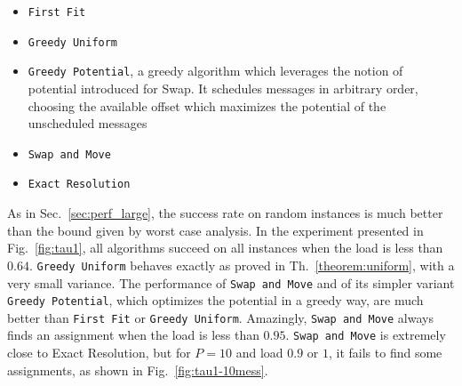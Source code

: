 \documentclass[a4paper,UKenglish,cleveref, autoref, thm-restate]{lipics-v2019}
\newcommand\firstfit{\texttt{First Fit}\xspace}
\newcommand\greedyuniform{\texttt{Greedy Uniform}\xspace}
\newcommand\swapandmove{\texttt{Swap and Move}\xspace}
\newcommand\greedypotential{\texttt{Greedy Potential}\xspace}
\begin{document}
\begin{itemize}
  \item \firstfit
  \item \greedyuniform 
  \item \greedypotential, a greedy algorithm which leverages the notion of potential introduced for Swap. 
  It schedules messages in arbitrary order, choosing the available offset which maximizes the potential of the unscheduled messages
  \item \swapandmove 
  \item \texttt{Exact Resolution}
\end{itemize}

As in Sec.~\ref{sec:perf_large}, the success rate on random instances is much better than the bound given by worst case analysis. In the experiment presented in Fig.~\ref{fig:tau1}, all algorithms succeed on all instances when the load is less than $0.64$. \greedyuniform behaves exactly as proved in Th.~\ref{theorem:uniform}, with a very small variance. The performance of \swapandmove and of its simpler variant \greedypotential, which optimizes the potential in a greedy way, are much better than \firstfit or \greedyuniform. Amazingly, \swapandmove always finds an assignment when the load is less than $0.95$. \swapandmove is extremely close to Exact Resolution, but for $P=10$ and load $0.9$ or $1$, it fails to find some assignments, as shown in Fig.~\ref{fig:tau1-10mess}.
\end{document}
